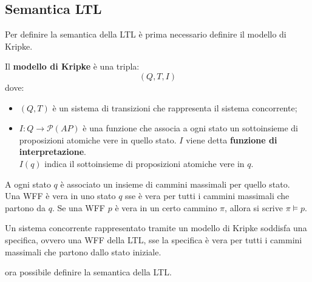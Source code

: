 \subsection{Semantica LTL}
Per definire la semantica della LTL è prima necessario definire il modello di Kripke.
\begin{defn}
    Il \textbf{modello di Kripke} è una tripla:
    \[
        (Q, T, I)
    \]
    dove:
    \begin{itemize}
        \item $(Q, T)$ è un sistema di transizioni che rappresenta il sistema concorrente;
        \item $I: Q \rightarrow \mathcal{P}(AP)$ è una funzione che associa a ogni stato un sottoinsieme di proposizioni atomiche vere in quello stato. $I$ viene detta \textbf{funzione di interpretazione}.\\
        $I(q)$ indica il sottoinsieme di proposizioni atomiche vere in $q$.
    \end{itemize}
\end{defn}

A ogni stato $q$ è associato un insieme di cammini massimali per quello stato.\\
Una WFF è vera in uno stato $q$ sse è vera per tutti i cammini massimali che partono da $q$.
Se una WFF $p$ è vera in un certo cammino $\pi$, allora si scrive $\pi \vDash p$. 

Un sistema concorrente rappresentato tramite un modello di Kripke soddisfa una specifica, ovvero una WFF della LTL, sse la specifica è vera per tutti i cammini massimali che partono dallo stato iniziale.

\upperAccE ora possibile definire la semantica della LTL.\\

